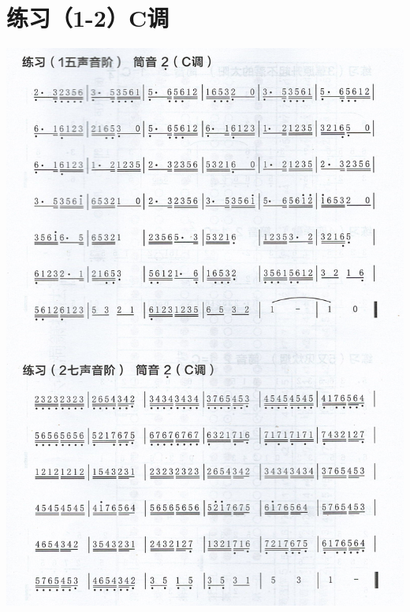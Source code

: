 \documentclass[cn,pad,chinese,chinesefont=nofont]{elegantbook}
\begin{document}
\section{练习（1-2）C调}
\includegraphics[height=\textheight]{dongxiao/Scan 5.jpeg}
\end{document}
